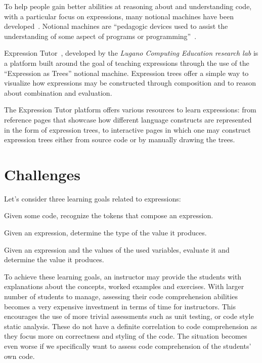 \begin{chapterBody}
To help people gain better abilities at reasoning about and understanding code,
with a particular focus on expressions, many notional machines have been
developed~\cite{fincher_notional_2020}. Notional machines
are ``pedagogic devices used to assist the understanding of some aspect of
programs or programming''~\cite{fincher_notional_2020}.

Expression Tutor~\cite{matthias_hauswirth_expression_2023}, developed by the
\textit{Lugano Computing Education research lab} is a platform built around the 
goal of teaching expressions through the use of the ``Expression as Trees''
notional machine.
Expression trees offer a simple way to visualize how expressions may be
constructed through composition and to reason about combination and evaluation.

The Expression Tutor platform offers various resources to learn expressions:
from reference pages that showcase how different language constructs are
represented in the form of expression trees, to interactive pages in which one
may construct expression trees either from source code or by manually drawing
the trees.

\section{Challenges}\label{sec:intro-problem}

Let's consider three learning goals related to expressions:
\begin{enumerate*}
    \item Given some code, recognize the tokens that compose an expression.
    \item Given an expression, determine the type of the value it produces.
    \item Given an expression and the values of the used variables, evaluate
it and determine the value it produces.
\end{enumerate*}

To achieve these learning goals, an instructor may provide the students with
explanations about the concepts, worked examples and exercises.
With larger number of students to manage, assessing their code comprehension
abilities becomes a very expensive investment in terms of time for instructors.
This encourages the use of more trivial assessments such as unit testing, or
code style static analysis. These do not have a definite correlation to code
comprehension as they focus more on correctness and styling of the code.
The situation becomes even worse if we specifically want to assess code 
comprehension of the students' own code.


\end{chapterBody}
